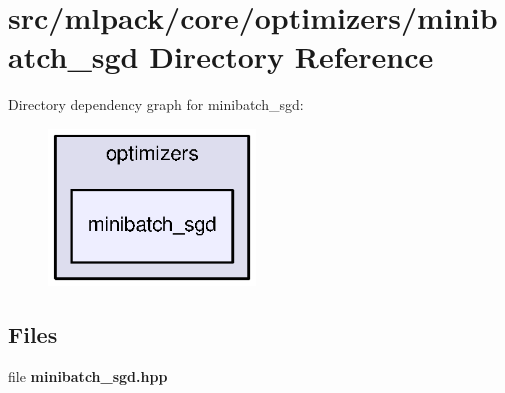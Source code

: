 \section{src/mlpack/core/optimizers/minibatch\+\_\+sgd Directory Reference}
\label{dir_66272309bbbae2ac1ebb1e2f8790a019}
Directory dependency graph for minibatch\+\_\+sgd\+:
\nopagebreak
\begin{figure}[H]
\begin{center}
\leavevmode
\includegraphics[width=156pt]{dir_66272309bbbae2ac1ebb1e2f8790a019_dep}
\end{center}
\end{figure}
\subsection*{Files}
\begin{DoxyCompactItemize}
\item 
file {\bf minibatch\+\_\+sgd.\+hpp}
\end{DoxyCompactItemize}
